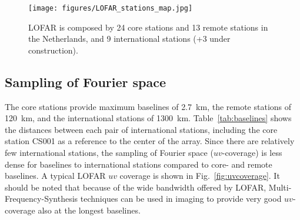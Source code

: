 \documentclass[graybox]{svmult}
\begin{document}

\begin{figure}[t]
\begin{center}
\texttt{[image: figures/LOFAR\_stations\_map.jpg]}
\caption{LOFAR is composed by 24 core stations and 13 remote stations in the
Netherlands, and 9 international stations (+3 under construction).}
\label{fig:stations}
\end{center}
\end{figure}


\subsection{Sampling of Fourier space}\label{sec:uvcoverage}
The core stations provide maximum baselines of 2.7~km, the remote stations of
120~km, and the international stations of 1300~km.  Table~\ref{tab:baselines}
shows the distances between each pair of international stations, including the
core station CS001 as a reference to the center of the array.  Since there are
relatively few international stations, the sampling of Fourier space
($uv$-coverage) is less dense for baselines to international stations compared
to core- and remote baselines.  A typical LOFAR $uv$ coverage is shown in
Fig.~\ref{fig:uvcoverage}.  It should be noted that because of the wide
bandwidth offered by LOFAR, Multi-Frequency-Synthesis techniques can be used in
imaging to provide very good $uv$-coverage also at the longest baselines.  
\end{document}

